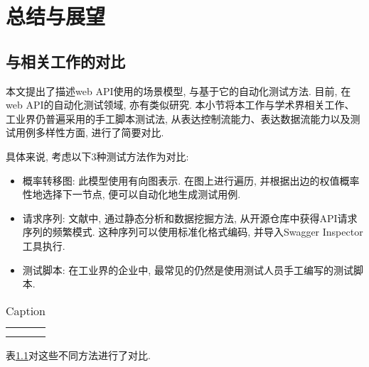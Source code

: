 \chapter{总结与展望}
    \section{与相关工作的对比}
        本文提出了描述web API使用的场景模型, 与基于它的自动化测试方法. 目前, 在web API的自动化测试领域, 亦有类似研究. 本小节将本工作与学术界相关工作、工业界仍普遍采用的手工脚本测试法, 从表达控制流能力、表达数据流能力以及测试用例多样性方面, 进行了简要对比.
    
        具体来说, 考虑以下3种测试方法作为对比:
        \begin{itemize}
            \item 概率转移图\cite{junyiw17}: 此模型使用有向图表示. 在图上进行遍历, 并根据出边的权值概率性地选择下一节点, 便可以自动化地生成测试用例.
            
            \item 请求序列: 文献\cite{taox06}\cite{xiaodongg16}中, 通过静态分析和数据挖掘方法, 从开源仓库中获得API请求序列的频繁模式. 这种序列可以使用标准化格式编码, 并导入Swagger Inspector工具\cite{swaggerinspetor17}执行.
            
            \item 测试脚本: 在工业界的企业中, 最常见的仍然是使用测试人员手工编写的测试脚本.
        \end{itemize}
        
        \begin{table}
            \centering
            \begin{tabular}{c|c}
                 &  \\
                 & 
            \end{tabular}
            \caption{Caption}
            \label{tab:related_work_compare}
        \end{table}
        
        表\ref{tab:related_work_compare}对这些不同方法进行了对比.

